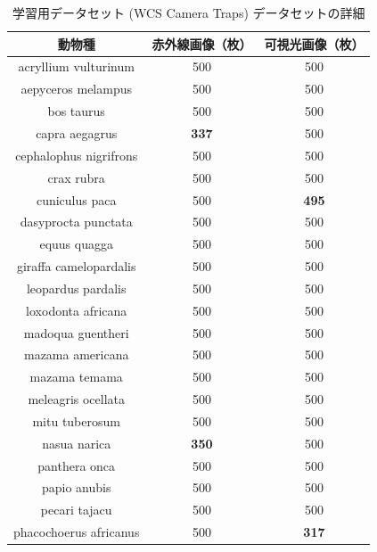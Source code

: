 \begin{table}[tbp]
  \centering
  \caption{学習用データセット (WCS Camera Traps) データセットの詳細}
  \label{tbl:wcs}
  \begin{tabular}{c|c|c}
      \hline
      動物種                    & 赤外線画像（枚） & 可視光画像（枚） \\ \hline\hline
      acryllium vulturinum     & 500          & 500          \\
      aepyceros melampus       & 500          & 500          \\
      bos taurus               & 500          & 500          \\
      capra aegagrus           & \textbf{337} & 500          \\
      cephalophus nigrifrons   & 500          & 500          \\
      crax rubra               & 500          & 500          \\
      cuniculus paca           & 500          & \textbf{495} \\
      dasyprocta punctata      & 500          & 500          \\
      equus quagga             & 500          & 500          \\
      giraffa camelopardalis   & 500          & 500          \\
      leopardus pardalis       & 500          & 500          \\
      loxodonta africana       & 500          & 500          \\
      madoqua guentheri        & 500          & 500          \\
      mazama americana         & 500          & 500          \\
      mazama temama            & 500          & 500          \\
      meleagris ocellata       & 500          & 500          \\
      mitu tuberosum           & 500          & 500          \\
      nasua narica             & \textbf{350} & 500          \\
      panthera onca            & 500          & 500          \\
      papio anubis             & 500          & 500          \\
      pecari tajacu            & 500          & 500          \\
      phacochoerus africanus   & 500          & \textbf{317} \\

\end{tabular}
\end{table}
